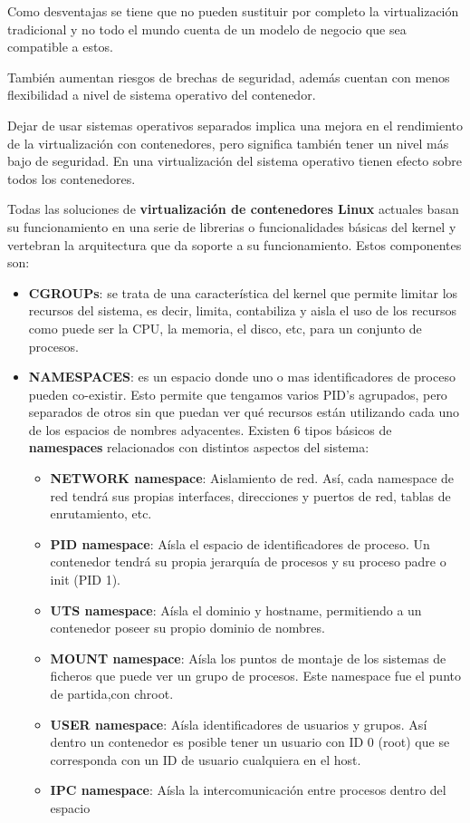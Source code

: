 Como desventajas se tiene que no pueden sustituir por completo la virtualización tradicional y no todo el mundo cuenta de un modelo de negocio que sea compatible a estos.

También aumentan riesgos de brechas de seguridad, además cuentan con menos flexibilidad a nivel de sistema operativo del contenedor.

Dejar de usar sistemas operativos separados implica una mejora en el rendimiento de la virtualización con contenedores, pero significa también tener un nivel más bajo de seguridad. En una virtualización del sistema operativo tienen efecto sobre todos los contenedores. 

Todas las soluciones de \textbf{virtualización de contenedores Linux} actuales basan su funcionamiento en una serie de librerias o funcionalidades básicas del kernel y vertebran la arquitectura que da soporte a su funcionamiento. Estos componentes son:

\begin{itemize}
	\item  \textbf{CGROUPs}: se trata de una característica del kernel que permite limitar los recursos del sistema, es decir, limita, contabiliza y aisla el uso de los recursos como puede ser la CPU, la memoria, el disco, etc, para un conjunto de procesos.
	\item \textbf{NAMESPACES}: es un espacio donde uno o mas identificadores de proceso pueden co-existir. Esto permite que tengamos varios PID’s agrupados, pero separados de otros sin que puedan ver qué recursos están utilizando cada uno de los espacios de nombres adyacentes. Existen 6 tipos básicos de \textbf{namespaces} relacionados con
	distintos aspectos del sistema:
	\begin{itemize}
		\item \textbf{NETWORK namespace}: Aislamiento de red. Así, cada namespace de red tendrá sus propias interfaces, direcciones y puertos de red, tablas de enrutamiento,
		etc.
		\item \textbf{PID namespace}: Aísla el espacio de identificadores de proceso. Un contenedor
		tendrá su propia jerarquía de procesos y su proceso padre o init (PID 1).
		\item \textbf{UTS namespace}: Aísla el dominio y hostname, permitiendo a un contenedor
		poseer su propio dominio de nombres.
		\item \textbf{MOUNT namespace}: Aísla los puntos de montaje de los sistemas de ficheros
		que puede ver un grupo de procesos. Este namespace fue el punto de partida,con chroot.
		\item \textbf{USER namespace}: Aísla identificadores de usuarios y grupos. Así dentro un
		contenedor es posible tener un usuario con ID 0 (root) que se corresponda con
		un ID de usuario cualquiera en el host.
		\item \textbf{IPC namespace}: Aísla la intercomunicación entre procesos dentro del espacio
	\end{itemize}
\end{itemize}

